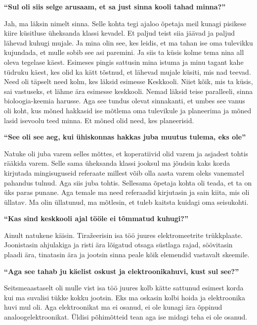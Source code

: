 \textbf{\enquote{Sul oli siis selge arusaam, et sa just sinna kooli tahad minna?}}

Jah, ma läksin nimelt sinna. Selle kohta tegi ajaloo õpetaja meil kunagi pisikese kiire küsitluse üheksanda klassi kevadel. Et paljud teist siia jäävad ja paljud lähevad kuhugi mujale. Ja mina olin see, kes leidis, et ma tahan ise oma tulevikku kujundada, et mulle sobib see asi paremini. Ja siis ta küsis kolme tema nina all oleva tegelase käest. Esimeses pingis sattusin mina istuma ja minu tagant kahe tüdruku käest, kes olid ka kätt tõstnud, et lähevad mujale küsiti, mis nad teevad. Need oli täpselt need kolm, kes läksid esimesse Keskkooli. Niiet kõik, mis ta küsis, sai vastuseks, et lähme ära esimesse keskkooli. Nemad läksid teise paralleeli, sinna bioloogia-keemia harusse. Aga see tundus olevat sinnakanti, et umbes see vanus oli koht, kus mõned hakkasid ise mõtlema oma tulevikule ja planeerima ja mõned lasid isevoolu teed minna. Et mõned olid need, kes planeerisid. 

\textbf{\enquote{See oli see aeg, kui ühiskonnas hakkas juba muutus tulema, eks ole}}

Natuke oli juba varem selles mõttes, et koperatiivid olid varem ja asjadest tohtis rääkida varem. Selle sama üheksanda klassi jooksul ma jõudsin kaks korda kirjutada mingisuguseid referaate millest võib olla aasta varem oleks vanematel pahandus tulnud. Aga siis juba tohtis. Sellesama õpetaja kohta oli teada, et ta on üks paras punane. Aga temale ma need referaadid kirjutasin ja sain kiita, mis oli üllatav. Ma olin üllatunud, ma mõtlesin, et tuleb kaitsta kuidagi oma seisukohti. 

\textbf{\enquote{Kas sind keskkooli ajal tööle ei tõmmatud kuhugi?}}

Ainult natukene käisin. Tiražeerisin isa töö juures elektromeetrite trükkplaate. Joonistasin ahjulakiga ja risti ära lõigatud otsaga süstlaga rajad, söövitasin plaadi ära, tinatasin ära ja jootsin sinna peale kõik elemendid vastavalt skeemile. 

\textbf{\enquote{Aga see tahab ju käelist oskust ja elektroonikahuvi, kust sul see?}}

Seitsmeaastaselt oli mulle vist isa töö juures kolb kätte sattunud esimest korda kui ma suvalisi tükke kokku jootsin. Eks ma oskasin kolbi hoida ja elektroonika huvi mul oli. Aga elektroonikat ma ei osanud, ei ole kunagi ära õppinud analoogelektroonikat. Üldisi põhimõtteid tean aga ise midagi teha ei ole osanud. 

